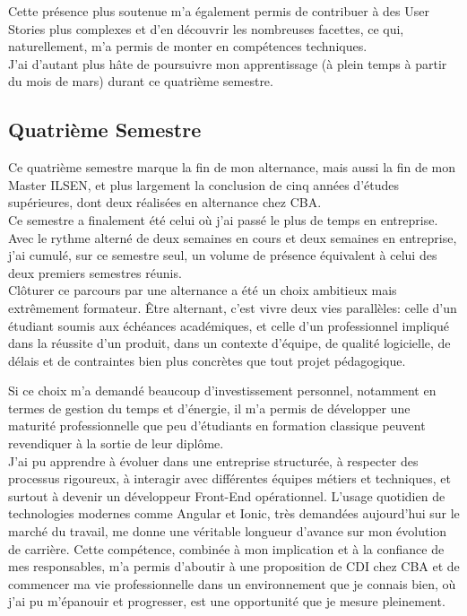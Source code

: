 \documentclass{article}
\begin{document}
Cette présence plus soutenue m'a également permis de contribuer à des User Stories plus complexes et d'en découvrir les nombreuses facettes, ce qui, naturellement, m'a permis de monter en compétences techniques. \\

J'ai d'autant plus hâte de poursuivre mon apprentissage (à plein temps à partir du mois de mars) durant ce quatrième semestre.

\newpage

\subsection{ Quatrième Semestre}

Ce quatrième semestre marque la fin de mon alternance, mais aussi la fin de mon Master ILSEN, et plus largement la conclusion de cinq années d'études supérieures, dont deux réalisées en alternance chez CBA. \\

Ce semestre a finalement été celui où j'ai passé le plus de temps en entreprise. Avec le rythme alterné de deux semaines en cours et deux semaines en entreprise, j'ai cumulé, sur ce semestre seul, un volume de présence équivalent à celui des deux premiers semestres réunis. \\

Clôturer ce parcours par une alternance a été un choix ambitieux mais extrêmement formateur. Être alternant, c'est vivre deux vies parallèles: celle d'un étudiant soumis aux échéances académiques, et celle d'un professionnel impliqué dans la réussite d'un produit, dans un contexte d'équipe, de qualité logicielle, de délais et de contraintes bien plus concrètes que tout projet pédagogique.

Si ce choix m'a demandé beaucoup d'investissement personnel, notamment en termes de gestion du temps et d'énergie, il m'a permis de développer une maturité professionnelle que peu d'étudiants en formation classique peuvent revendiquer à la sortie de leur diplôme. \\

J'ai pu apprendre à évoluer dans une entreprise structurée, à respecter des processus rigoureux, à interagir avec différentes équipes métiers et techniques, et surtout à devenir un développeur Front-End opérationnel. L'usage quotidien de technologies modernes comme Angular et Ionic, très demandées aujourd'hui sur le marché du travail, me donne une véritable longueur d'avance sur mon évolution de carrière. Cette compétence, combinée à mon implication et à la confiance de mes responsables, m'a permis d'aboutir à une proposition de CDI chez CBA et de commencer ma vie professionnelle dans un environnement que je connais bien, où j'ai pu m'épanouir et progresser, est une opportunité que je mesure pleinement. \\
\end{document}
